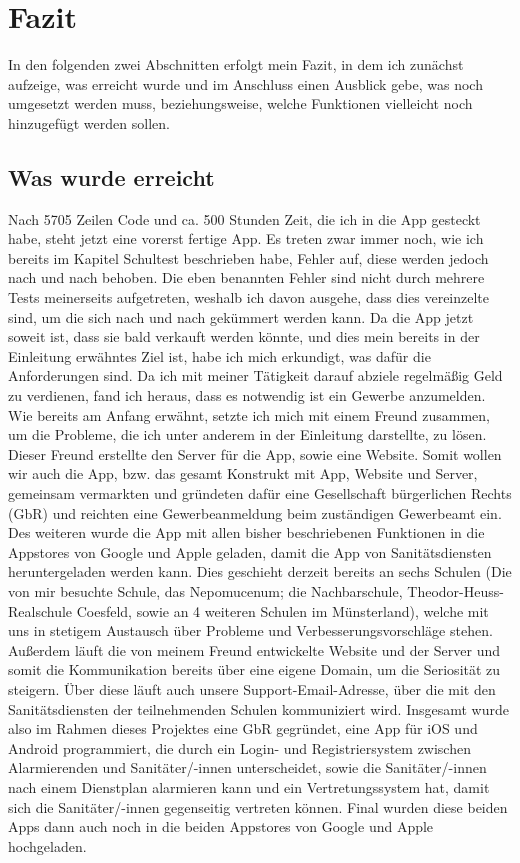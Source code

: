 \section{Fazit}
In den folgenden zwei Abschnitten erfolgt mein Fazit, in dem ich zunächst aufzeige, was erreicht wurde und 
im Anschluss einen Ausblick gebe, was noch umgesetzt werden muss, beziehungsweise, welche Funktionen vielleicht noch hinzugefügt werden sollen.
\subsection{Was wurde erreicht}
    Nach 5705 Zeilen Code und ca. 500 Stunden Zeit, die ich in die App gesteckt habe, steht jetzt eine vorerst fertige App.
    Es treten zwar immer noch, wie ich bereits im Kapitel Schultest beschrieben habe, Fehler auf, diese werden
    jedoch nach und nach behoben. Die eben benannten Fehler sind nicht durch mehrere Tests meinerseits aufgetreten, weshalb
    ich davon ausgehe, dass dies vereinzelte sind, um die sich nach und nach gekümmert werden kann. Da die App jetzt 
    soweit ist, dass sie bald verkauft werden könnte, und dies mein bereits in der Einleitung erwähntes Ziel ist,
    habe ich mich erkundigt, was dafür die Anforderungen sind. Da ich mit meiner Tätigkeit darauf abziele regelmäßig Geld
    zu verdienen, fand ich heraus, dass es notwendig ist ein Gewerbe anzumelden.
    Wie bereits am Anfang erwähnt, setzte ich mich mit einem Freund zusammen, um die Probleme, die ich unter anderem 
    in der Einleitung darstellte, zu lösen. Dieser Freund erstellte den Server für die App, sowie eine Website.
    Somit wollen wir auch die App, bzw. das gesamt Konstrukt mit App, Website und Server, gemeinsam vermarkten und gründeten
    dafür eine Gesellschaft bürgerlichen Rechts (GbR) und reichten eine Gewerbeanmeldung beim zuständigen Gewerbeamt ein.
    Des weiteren wurde die App mit allen bisher beschriebenen Funktionen in die Appstores von Google und Apple geladen, damit die App von Sanitätsdiensten 
    heruntergeladen werden kann. Dies geschieht derzeit bereits an sechs Schulen (Die von mir besuchte Schule, das Nepomucenum; die Nachbarschule, 
    Theodor-Heuss-Realschule Coesfeld, sowie an 4 weiteren Schulen im Münsterland), welche mit uns in stetigem Austausch über Probleme und 
    Verbesserungsvorschläge stehen. Außerdem läuft die von meinem Freund entwickelte Website und der Server und somit die Kommunikation bereits über eine eigene Domain,
    um die Seriosität zu steigern. Über diese läuft auch unsere Support-Email-Adresse, über die mit den Sanitätsdiensten der teilnehmenden Schulen kommuniziert
    wird. Insgesamt wurde also im Rahmen dieses Projektes eine GbR gegründet, eine App für iOS und Android programmiert, die durch ein 
    Login- und Registriersystem zwischen Alarmierenden und Sanitäter/-innen unterscheidet, sowie
    die Sanitäter/-innen nach einem Dienstplan alarmieren kann und ein Vertretungssystem hat, damit sich die Sanitäter/-innen 
    gegenseitig vertreten können. Final wurden diese beiden Apps dann auch noch in die beiden Appstores von Google und Apple hochgeladen.
